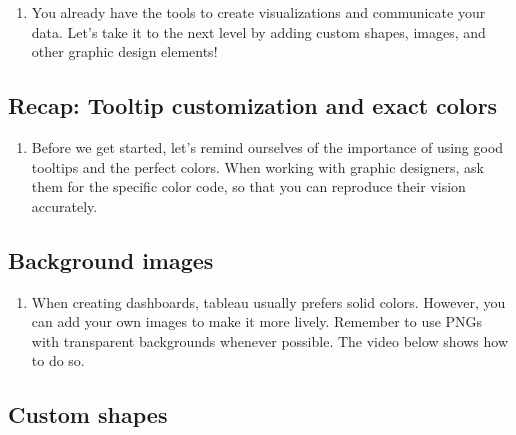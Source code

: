 \documentclass[
]{book}
\providecommand{\tightlist}{%
  \setlength{\itemsep}{0pt}\setlength{\parskip}{0pt}}
\begin{document}
\begin{enumerate}
\def\labelenumi{\arabic{enumi}.}
\tightlist
\item
  You already have the tools to create visualizations and communicate your data. Let's take it to the next level by adding custom shapes, images, and other graphic design elements!
\end{enumerate}

\hypertarget{recap-tooltip-customization-and-exact-colors}{%
\subsection{Recap: Tooltip customization and exact colors}\label{recap-tooltip-customization-and-exact-colors}}

\begin{enumerate}
\def\labelenumi{\arabic{enumi}.}
\tightlist
\item
  Before we get started, let's remind ourselves of the importance of using good tooltips and the perfect colors. When working with graphic designers, ask them for the specific color code, so that you can reproduce their vision accurately.
\end{enumerate}

\hypertarget{background-images}{%
\subsection{Background images}\label{background-images}}

\begin{enumerate}
\def\labelenumi{\arabic{enumi}.}
\tightlist
\item
  When creating dashboards, tableau usually prefers solid colors. However, you can add your own images to make it more lively. Remember to use PNGs with transparent backgrounds whenever possible. The video below shows how to do so.
\end{enumerate}

\hypertarget{custom-shapes}{%
\subsection{Custom shapes}\label{custom-shapes}}
\end{document}
